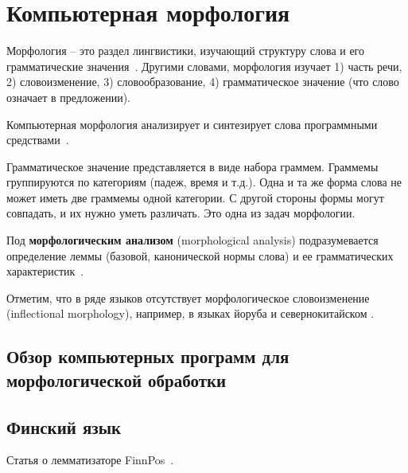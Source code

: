 \section{Компьютерная морфология} \label{sect_review_comp_morphology}

Морфология -- это раздел лингвистики, изучающий структуру слова и его грамматические значения~\cite{MitreninaNikolaevLando2016}. Другими словами, морфология изучает
1) часть речи,
2) словоизменение,
3) словообразование,
4) грамматическое значение (что слово означает в предложении). 

Компьютерная морфология анализирует и синтезирует слова программными средствами~\cite{MitreninaNikolaevLando2016}. 

Грамматическое значение представляется в виде набора граммем. 
Граммемы группируются по категориям (падеж, время и т.д.). 
Одна и та же форма слова не может иметь две граммемы одной категории. 
С другой стороны формы могут совпадать, и их нужно уметь различать. 
Это одна из задач морфологии.


Под \textbf{морфологическим анализом} (morphological analysis) 
подразумевается определение леммы (базовой, канонической нормы слова) и ее грамматических характеристик~\cite{MitreninaNikolaevLando2016}.

Отметим, что в ряде языков отсутствует морфологическое словоизменение (inflectional morphology), 
например, в языках йоруба и севернокитайском .


\subsection{Обзор компьютерных программ для морфологической обработки}

\subsection{Финский язык} \label{sect_review_fin}

Статья о лемматизаторе FinnPos~\cite{silfverberg2016finnpos}.

